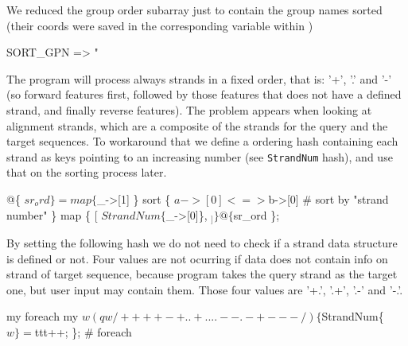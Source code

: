 \documentclass[11pt]{article}
\def\nwendcode{\endtrivlist \endgroup} %
\let\nwdocspar=\par                    %
\begin{document}
We reduced the group order subarray just to contain the group names sorted (their coords were saved in the corresponding variable within )

\nwenddocs{}\plusendmoddef
SORT_GPN => "\\%
\nwendcode{}\nwdocspar



The program will process always strands in a fixed order, that is: '+', '.' and '-' (so forward features first, followed by those features that does not have a defined strand, and finally reverse features). The problem appears when looking at alignment strands, which are a composite of the strands for the query and the target sequences. To workaround that we define a ordering hash containing each strand as keys pointing to an increasing number (see {\tt{}{}StrandNum} hash), and use that on the sorting process later. 

\nwenddocs{}\endmoddef
@\{ $sr_ord \} = map \{ $_->[1] \}
               sort \{ 
                      $a->[0] <=> $b->[0]  # sort by "strand number"
                    \}
               map \{ [ $StrandNum\{$_->[0]\}, $_ ] \} @\{ $sr_ord \};
\nwendcode{}\nwdocspar

By setting the following hash we do not need to check if a strand data structure is defined or not. Four values are not ocurring if data does not contain info on strand of target sequence, because program takes the query strand as the target one, but user input may contain them. Those four values are '+.', '.+', '.-' and '-.'.

\nwenddocs{}\plusendmoddef
my %
foreach my $w (qw/ + ++ +- +. .+ . .. .- -. -+ -- - /) \{
    $StrandNum\{$w\} = $ttt++;
\}; # foreach
\eatline
{}\nwendcode{}\nwdocspar
{}
\end{document}
